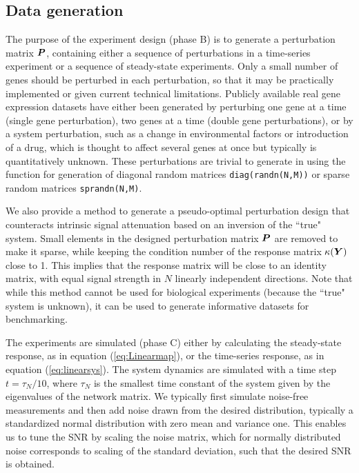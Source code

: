 \subsection{Data generation}
\label{sec:data_generation}


The purpose of the experiment design (phase B) is to generate a perturbation matrix \({\boldsymbol{P}}\), containing either a sequence of perturbations in a time-series experiment or a sequence of steady-state experiments. 
Only a small number of genes should be perturbed in each perturbation, so that it may be practically implemented \invivo or \invitro given current technical limitations.
Publicly available real gene expression datasets have either been generated by perturbing one gene at a time (single gene perturbation), two genes at a time (double gene perturbations), or by a system perturbation, such as a change in environmental factors or introduction of a drug, which is thought to affect several genes at once but typically is quantitatively unknown.
These perturbations are trivial to generate in \matlab using \eg the function for generation of diagonal random matrices \texttt{diag(randn(N,M))} or sparse random matrices \texttt{sprandn(N,M)}.

We also provide a method to generate a pseudo-optimal perturbation design that counteracts intrinsic signal attenuation based on an inversion of the ``true" system. 
Small elements in the designed perturbation matrix \({\boldsymbol{P}}\) are removed to make it sparse, while keeping the condition number of the response matrix \(\kappa({\boldsymbol{Y}})\)  close to 1.
This implies that the response matrix will be close to an identity matrix, with equal signal strength in \(N\) linearly independent directions.
Note that while this method cannot be used for biological experiments (because the ``true" system is unknown), it can be used to generate informative datasets for benchmarking.

The experiments are simulated (phase C) either by calculating the steady-state response, as in equation (\ref{eq:Linearmap}), or the time-series response, as in equation (\ref{eq:linearsys}).
The system dynamics are simulated with a time step \(t = \tau_N/10\), where \(\tau_N\) is the smallest time constant of the system given by the eigenvalues of the network matrix.
We typically first simulate noise-free measurements and then add noise drawn from the desired distribution, typically a standardized normal distribution with zero mean and variance one.
This enables us to tune the SNR by scaling the noise matrix, which for normally distributed noise corresponds to scaling of the standard deviation, such that the desired SNR is obtained. 

